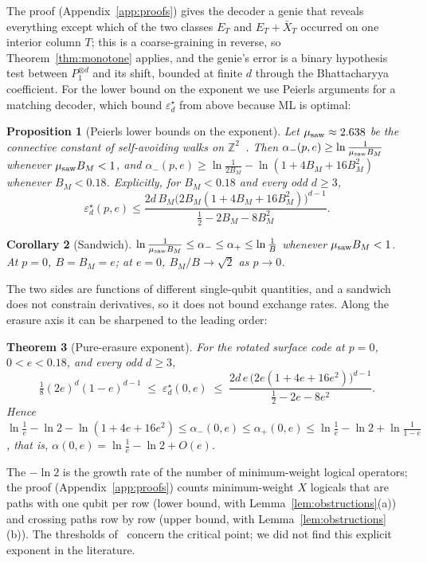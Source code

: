 \documentclass[11pt,a4paper]{article}
\theoremstyle{plain}
\newtheorem{theorem}{Theorem}[section]
\newtheorem{proposition}[theorem]{Proposition}
\newtheorem{corollary}[theorem]{Corollary}
\theoremstyle{definition}
\theoremstyle{remark}
\newcommand{\err}{\varepsilon^{\star}}
\begin{document}
\noindent The proof (Appendix~\ref{app:proofs}) gives the decoder a genie that reveals everything except which of the two classes $E_T$ and $E_T+\bar X_T$ occurred on one interior column $T$; this is a coarse-graining in reverse, so Theorem~\ref{thm:monotone} applies, and the genie's error is a binary hypothesis test between $P_1^{\otimes d}$ and its shift, bounded at finite $d$ through the Bhattacharyya coefficient. For the lower bound on the exponent we use Peierls arguments for a matching decoder, which bound $\err_d$ from above because ML is optimal:

\begin{proposition}[Peierls lower bounds on the exponent]\label{prop:peierls}
Let $\mu_{\rm saw}\approx2.638$ be the connective constant of self-avoiding walks on $\mathbb Z^2$~\cite{MS}. Then $\alpha_-(p,e)\ge\ln\frac1{\mu_{\rm saw}B_M}$ whenever $\mu_{\rm saw}B_M<1$, and $\alpha_-(p,e)\ge\ln\frac1{2B_M}-\ln(1+4B_M+16B_M^2)$ whenever $B_M<0.18$. Explicitly, for $B_M<0.18$ and every odd $d\ge3$,
\[
\err_d(p,e)\le\frac{2d\,B_M\big(2B_M(1+4B_M+16B_M^2)\big)^{d-1}}{\tfrac12-2B_M-8B_M^2}.
\]
\end{proposition}

\begin{corollary}[Sandwich]\label{cor:sandwich}
$\ln\frac1{\mu_{\rm saw}B_M}\le\alpha_-\le\alpha_+\le\ln\frac1B$ whenever $\mu_{\rm saw}B_M<1$. At $p=0$, $B=B_M=e$; at $e=0$, $B_M/B\to\sqrt2$ as $p\to0$.
\end{corollary}

\noindent The two sides are functions of different single-qubit quantities, and a sandwich does not constrain derivatives, so it does not bound exchange rates. Along the erasure axis it can be sharpened to the leading order:

\begin{theorem}[Pure-erasure exponent]\label{thm:erasure-exponent}
For the rotated surface code at $p=0$, $0<e<0.18$, and every odd $d\ge3$,
\[
\tfrac18(2e)^d(1-e)^{d-1}\;\le\;\err_d(0,e)\;\le\;\frac{2d\,e\,\big(2e(1+4e+16e^2)\big)^{d-1}}{\tfrac12-2e-8e^2}.
\]
Hence $\ln\frac1e-\ln2-\ln(1+4e+16e^2)\le\alpha_-(0,e)\le\alpha_+(0,e)\le\ln\frac1e-\ln2+\ln\frac1{1-e}$, that is, $\alpha(0,e)=\ln\frac1e-\ln2+O(e)$.
\end{theorem}

\noindent The $-\ln2$ is the growth rate of the number of minimum-weight logical operators; the proof (Appendix~\ref{app:proofs}) counts minimum-weight $X$ logicals that are paths with one qubit per row (lower bound, with Lemma~\ref{lem:obstructions}(a)) and crossing paths row by row (upper bound, with Lemma~\ref{lem:obstructions}(b)). The thresholds of~\cite{SBD,Colmenarez} concern the critical point; we did not find this explicit exponent in the literature.
\end{document}
